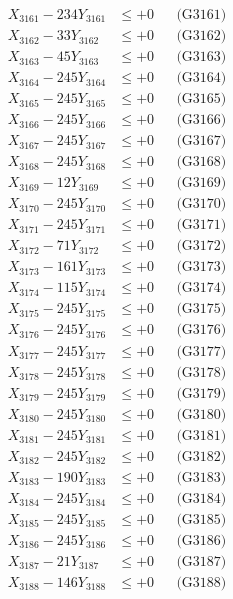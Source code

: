 \documentclass[a4paper,10pt]{article}
\begin{document}
{\begin{align}
\allowbreak
X_{3161} - 234Y_{3161} &\leq +0 && \text{(G3161)} \\
X_{3162} - 33Y_{3162} &\leq +0 && \text{(G3162)} \\
X_{3163} - 45Y_{3163} &\leq +0 && \text{(G3163)} \\
X_{3164} - 245Y_{3164} &\leq +0 && \text{(G3164)} \\
X_{3165} - 245Y_{3165} &\leq +0 && \text{(G3165)} \\
X_{3166} - 245Y_{3166} &\leq +0 && \text{(G3166)} \\
X_{3167} - 245Y_{3167} &\leq +0 && \text{(G3167)} \\
X_{3168} - 245Y_{3168} &\leq +0 && \text{(G3168)} \\
X_{3169} - 12Y_{3169} &\leq +0 && \text{(G3169)} \\
X_{3170} - 245Y_{3170} &\leq +0 && \text{(G3170)} \\
\allowbreak
X_{3171} - 245Y_{3171} &\leq +0 && \text{(G3171)} \\
X_{3172} - 71Y_{3172} &\leq +0 && \text{(G3172)} \\
X_{3173} - 161Y_{3173} &\leq +0 && \text{(G3173)} \\
X_{3174} - 115Y_{3174} &\leq +0 && \text{(G3174)} \\
X_{3175} - 245Y_{3175} &\leq +0 && \text{(G3175)} \\
X_{3176} - 245Y_{3176} &\leq +0 && \text{(G3176)} \\
X_{3177} - 245Y_{3177} &\leq +0 && \text{(G3177)} \\
X_{3178} - 245Y_{3178} &\leq +0 && \text{(G3178)} \\
X_{3179} - 245Y_{3179} &\leq +0 && \text{(G3179)} \\
X_{3180} - 245Y_{3180} &\leq +0 && \text{(G3180)} \\
\allowbreak
X_{3181} - 245Y_{3181} &\leq +0 && \text{(G3181)} \\
X_{3182} - 245Y_{3182} &\leq +0 && \text{(G3182)} \\
X_{3183} - 190Y_{3183} &\leq +0 && \text{(G3183)} \\
X_{3184} - 245Y_{3184} &\leq +0 && \text{(G3184)} \\
X_{3185} - 245Y_{3185} &\leq +0 && \text{(G3185)} \\
X_{3186} - 245Y_{3186} &\leq +0 && \text{(G3186)} \\
X_{3187} - 21Y_{3187} &\leq +0 && \text{(G3187)} \\
X_{3188} - 146Y_{3188} &\leq +0 && \text{(G3188)} \\

\end{align}}
\end{document}
